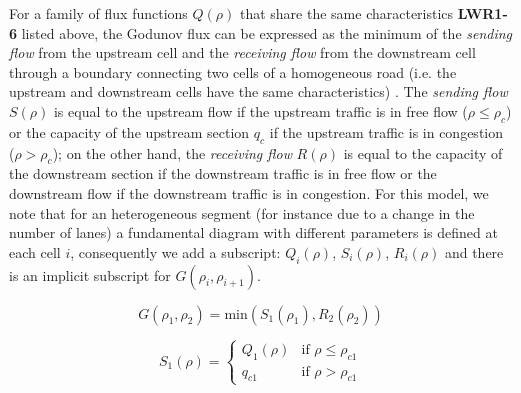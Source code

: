 \documentclass[11pt]{article}
\numberwithin{equation}{section}
\numberwithin{figure}{section}
\numberwithin{table}{section}
\begin{document}
For a family of flux functions $Q(\rho)$ that share the same characteristics \textbf{LWR1-6} listed above, the Godunov flux can be expressed as the minimum of the \textit{sending flow} from the upstream cell and the \textit{receiving flow} from the downstream cell through a boundary connecting two cells of a homogeneous road (i.e. the upstream and downstream cells have the same characteristics) \footnotemark. The \textit{sending flow} $S(\rho)$ is equal to the upstream flow if the upstream traffic is in free flow ($\rho \leq \rho_{c}$) or the capacity of the upstream section $q_{c}$ if the upstream traffic is in congestion ($\rho > \rho_{c}$); on the other hand, the \textit{receiving flow} $R(\rho)$ is equal to the capacity of the downstream section if the downstream traffic is in free flow or the downstream flow if the downstream traffic is in congestion. For this model, we note that for an heterogeneous segment (for instance due to a change in the number of lanes) a fundamental diagram with different parameters is defined at each cell $i$, consequently we add a subscript: $Q_{i}(\rho)$, $S_{i}(\rho)$, $R_{i}(\rho)$ and there is an implicit subscript for $G(\rho_{i},\rho_{i+1})$.


\begin{equation} \label{eq:rhoGodunovFlux1}
G(\rho_{1},\rho_{2}) = \text{min}(S_{1}(\rho_{1}),R_{2}(\rho_{2}))
\end{equation}

\begin{equation} \label{eq:sendingFlow1}
S_{1}(\rho) = \begin{cases}
Q_{1}(\rho) & \text{if } \rho \leq \rho_{c1} \\
q_{c1} &  \text{if } \rho > \rho_{c1}
\end{cases}
\end{equation}
\end{document}
